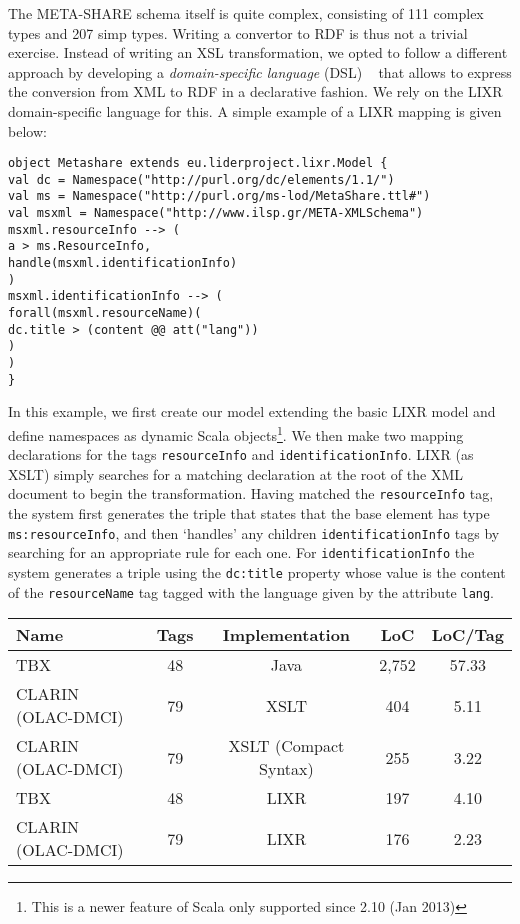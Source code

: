 \documentclass{llncs}
\begin{document}
{The META-SHARE schema itself is quite complex, consisting of 111 complex types and 207 simp types. 
Writing a convertor to RDF is thus not a trivial exercise. Instead of writing an XSL transformation, we opted to follow a different approach by developing a \emph{domain-specific language} (DSL) ~\cite{fowler2010domain} that allows to express the conversion from XML to RDF in a declarative fashion.
We rely on the LIXR domain-specific language for this. A simple example of a
LIXR mapping is given below:
{\footnotesize
\begin{verbatim}
object Metashare extends eu.liderproject.lixr.Model {
val dc = Namespace("http://purl.org/dc/elements/1.1/")
val ms = Namespace("http://purl.org/ms-lod/MetaShare.ttl#")
val msxml = Namespace("http://www.ilsp.gr/META-XMLSchema")
msxml.resourceInfo --> (
a > ms.ResourceInfo,
handle(msxml.identificationInfo)
)
msxml.identificationInfo --> (
forall(msxml.resourceName)(
dc.title > (content @@ att("lang"))
)
)
}
\end{verbatim}}
In this example, we first create our model extending the basic LIXR model and
define namespaces as dynamic Scala objects\footnote{This is a newer feature of
Scala only supported since 2.10 (Jan 2013)}. We then make two mapping
declarations for the tags {\tt resourceInfo} and {\tt identificationInfo}. LIXR (as
XSLT) simply searches for a matching declaration at the root of the XML document
to begin the transformation. Having matched the {\tt resourceInfo} tag, the system
first generates the triple that states that the base element has type
{\tt ms:resourceInfo}, and then `handles' any children {\tt identificationInfo} tags by
searching for an appropriate rule for each one. For {\tt identificationInfo} the
system generates a triple using the {\tt dc:title} property whose value is the
content of the {\tt resourceName} tag tagged with the language given by the
attribute {\tt lang}.
\begin{table}
\begin{center}
\begin{tabular}{p{4cm}|cccc}
Name & Tags & Implementation & LoC & LoC/Tag \\
\hline
TBX & 48 & Java & 2,752 & 57.33 \\
CLARIN (OLAC-DMCI) & 79 & XSLT & 404 & 5.11 \\
CLARIN (OLAC-DMCI) & 79 & XSLT (Compact Syntax) & 255 & 3.22 \\
\hline
TBX & 48 & LIXR & 197 & 4.10 \\
CLARIN (OLAC-DMCI) & 79 & LIXR & 176 & 2.23 \\

\end{tabular}
\end{center}
\end{table}}
\end{document}
